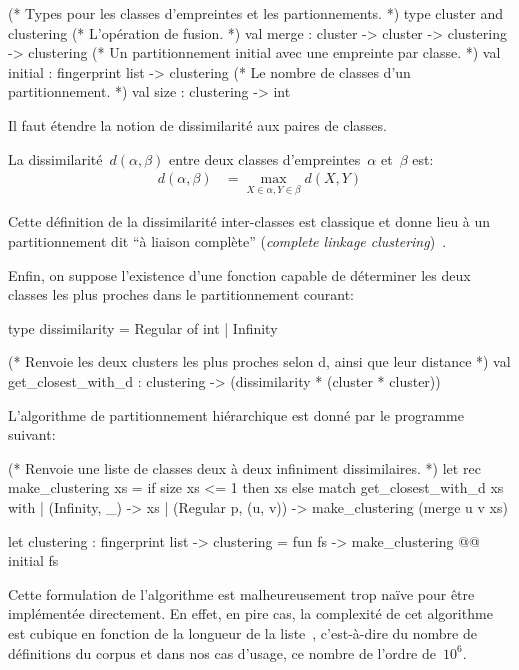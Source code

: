 \begin{ocaml}
(* Types pour les classes d'empreintes et les partionnements. *)
type cluster and clustering
(* L'opération de fusion. *)
val merge : cluster -> cluster -> clustering -> clustering
(* Un partitionnement initial avec une empreinte par classe. *)
val initial : fingerprint list -> clustering
(* Le nombre de classes d'un partitionnement. *)
val size : clustering -> int
\end{ocaml}

Il faut étendre la notion de dissimilarité aux paires de classes.

\begin{defn}
La dissimilarité~$d(\alpha, \beta)$ entre deux classes
d'empreintes~$\alpha$ et~$\beta$ est:
\begin{align*}
d(\alpha,\beta) &= \max\limits_{X \in \alpha, Y \in \beta} d(X,Y)
\end{align*}
\end{defn}

Cette définition de la dissimilarité inter-classes est classique et
donne lieu à un partitionnement dit ``à liaison complète'' (\emph{complete
  linkage clustering})~\cite{DBLP:books/crc/aggarwal13/ReddyV13}.

Enfin, on suppose l'existence d'une fonction capable de déterminer
les deux classes les plus proches dans le partitionnement courant:

\begin{ocaml}
type dissimilarity = Regular of int | Infinity

(* Renvoie les deux clusters les plus proches selon d, ainsi que leur distance *)
val get_closest_with_d : clustering -> (dissimilarity * (cluster * cluster))
\end{ocaml}

L'algorithme de partitionnement hiérarchique est donné par le programme {\OCaml} suivant:

\begin{ocaml}
(* Renvoie une liste de classes deux à deux infiniment dissimilaires. *)
let rec make_clustering xs =
  if size xs <= 1 then xs
  else match get_closest_with_d xs with
   | (Infinity, _) -> xs
   | (Regular p, (u, v)) -> make_clustering (merge u v xs)

let clustering : fingerprint list -> clustering = fun fs ->
  make_clustering @@ initial fs
\end{ocaml}

Cette formulation de l'algorithme est malheureusement trop naïve pour
être implémentée directement. En effet, en pire cas, la complexité de
cet algorithme est cubique en fonction de la longueur de la
liste~, c'est-à-dire du nombre de définitions du
corpus et dans nos cas d'usage, ce nombre de l'ordre de~$10^6$.

